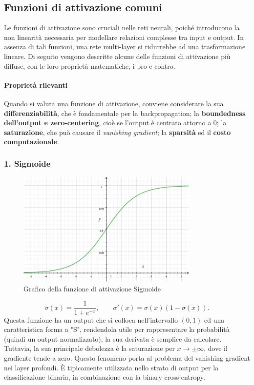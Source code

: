 \documentclass[a4paper,12pt]{report}
\begin{document}
	\subsection{Funzioni di attivazione comuni}
	Le funzioni di attivazione sono cruciali nelle reti neurali, poiché introducono la non linearità necessaria per modellare relazioni complesse tra input e output. In assenza di tali funzioni, una rete multi-layer si ridurrebbe ad una trasformazione lineare. Di seguito vengono descritte alcune delle funzioni di attivazione più diffuse, con le loro proprietà matematiche, i pro e contro.
	
	\paragraph{Proprietà rilevanti}
	Quando si valuta una funzione di attivazione, conviene considerare la sua \textbf{differenziabilità}, che è fondamentale per la backpropagation; la \textbf{boundedness dell'output e zero-centering}, cioè se l'output è centrato attorno a 0; la \textbf{saturazione}, che può causare il \textit{vanishing gradient}; la \textbf{sparsità} ed il \textbf{costo computazionale}.
	
	\subsubsection{1. Sigmoide}
	\begin{figure}[H]
		\centering
		\includegraphics[width=0.8\textwidth]{img/sigmoid.png}
		\caption{Grafico della funzione di attivazione Sigmoide}
	\end{figure}
	\[
	\sigma(x) = \frac{1}{1+e^{-x}},\qquad
	\sigma'(x)=\sigma(x)(1-\sigma(x)).
	\]
	Questa funzione ha un output che si colloca nell'intervallo $(0,1)$ ed una caratteristica forma a "S", rendendola utile per rappresentare la probabilità (quindi un output normalizzato); la sua derivata è semplice da calcolare. Tuttavia, la sua principale debolezza è la saturazione per $x\to\pm\infty$, dove il gradiente tende a zero. Questo fenomeno porta al problema del vanishing gradient nei layer profondi. È tipicamente utilizzata nello strato di output per la classificazione binaria, in combinazione con la binary cross-entropy.
	
\end{document}
